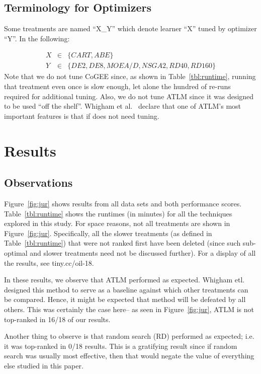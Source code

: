 \subsection{Terminology for Optimizers}

Some treatments are named ``X\_Y'' which  denote learner ``X'' tuned by optimizer ``Y''.
In the following: 

{\small \begin{eqnarray} 
X &\in &\{\mathit{CART},\mathit{ABE}\}\nonumber\\
Y &\in &\{\mathit{DE2},\mathit{DE8},\mathit{MOEA/D},\mathit{NSGA2},\mathit{RD40}, \mathit{RD160}\}\nonumber
\end{eqnarray}}
Note that we do not tune CoGEE since, as shown in Table~\ref{tbl:runtime}, running that treatment even once is slow enough, let alone the hundred of re-runs required for additional tuning. Also, we do not tune ATLM since it was designed to be used ``off the shelf''.  Whigham et al.~\cite{Whigham:2015} declare that one of ATLM's most important features is that if does not need tuning.




\section{Results}
 
\subsection{Observations}
 Figure~\ref{fig:jur} shows results from all
 data sets and both performance scores. 
 Table~\ref{tbl:runtime} shows the runtimes (in minutes) for all
 the techniques explored in this study.
 For space reasons,
 not 
 all treatments are shown in Figure~\ref{fig:jur}. Specifically, all the slower treatments
 (as defined in Table~\ref{tbl:runtime}) that were not ranked first   have been deleted (since such sub-optimal and slower
 treatments need not be discussed further). For a display of all the  results, see tiny.cc/oil-18.


In these results, we observe that ATLM performed as expected. Whigham etl.~\cite{Whigham:2015} designed this method to serve as a baseline against which other treatments can be compared. Hence, it might be
expected that   method will be defeated
by all others. This was certainly the
case here--
 as seen in Figure~\ref{fig:jur}, ATLM is not top-ranked in 16/18 of our results. 

Another thing to observe is that  random search (RD)  performed as expected; i.e. it was top-ranked in 0/18 results. This is a gratifying result since if random search was usually most effective, then that would negate the value of everything else studied in this paper.


